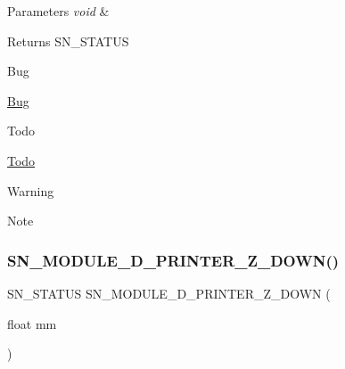 \begin{DoxyParams}{Parameters}
{\em void} & \\
\hline
\end{DoxyParams}
\begin{DoxyReturn}{Returns}
S\+N\+\_\+\+S\+T\+A\+T\+US 
\end{DoxyReturn}
\begin{DoxyRefDesc}{Bug}
\item[\hyperlink{bug__bug000003}{Bug}]\end{DoxyRefDesc}
\begin{DoxyRefDesc}{Todo}
\item[\hyperlink{todo__todo000003}{Todo}]\end{DoxyRefDesc}
\begin{DoxyWarning}{Warning}

\end{DoxyWarning}
\begin{DoxyNote}{Note}

\end{DoxyNote}
\mbox{\label{group__Module_ga5747a0d753cb9d79747db6f4a22b18e9}} 
\subsubsection{\texorpdfstring{S\+N\+\_\+\+M\+O\+D\+U\+L\+E\+\_\+D\+\_\+\+P\+R\+I\+N\+T\+E\+R\+\_\+\+Z\+\_\+\+D\+O\+W\+N()}{SN\_MODULE\_3D\_PRINTER\_Z\_DOWN()}}
{\footnotesize\ttfamily S\+N\+\_\+\+S\+T\+A\+T\+US S\+N\+\_\+\+M\+O\+D\+U\+L\+E\+\_\+D\+\_\+\+P\+R\+I\+N\+T\+E\+R\+\_\+\+Z\+\_\+\+D\+O\+WN (\begin{DoxyParamCaption}\item[{float}]{mm }\end{DoxyParamCaption})}


